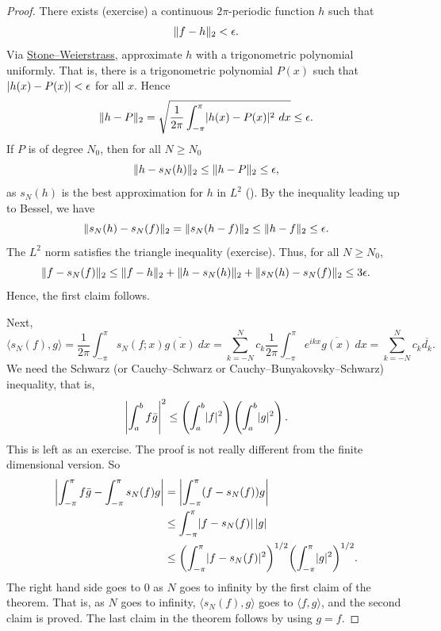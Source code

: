 \begin{proof}
There exists (exercise)
a continuous $2\pi$-periodic function $h$ such that
\begin{equation*}
\lVert {f-h} \rVert_2 < \epsilon .
\end{equation*}
Via \hyperref[thm:SWcomplex]{Stone--Weierstrass},
approximate $h$ with a trigonometric polynomial
uniformly.  That is, there is a trigonometric polynomial $P(x)$
such that
$\lvert {h(x) - P(x)} \rvert < \epsilon$ for all $x$.
Hence
\begin{equation*}
\lVert {h-P} \rVert_2
=
\sqrt{
\frac{1}{2\pi}
\int_{-\pi}^{\pi}
\lvert {h(x)-P(x)} \rvert^2
~
dx
}
\leq \epsilon.
\end{equation*}
If $P$ is of degree $N_0$, then for all $N \geq N_0$
\begin{equation*}
\lVert {h-s_N(h)} \rVert_2 \leq \lVert {h-P} \rVert_2 \leq \epsilon ,
\end{equation*}
as $s_N(h)$ is the best approximation for $h$ in $L^2$ ().
By the inequality leading up to Bessel, we have
\begin{equation*}
\lVert {s_N(h)-s_N(f)} \rVert_2
=
\lVert {s_N(h-f)} \rVert_2
\leq
\lVert {h-f} \rVert_2 \leq \epsilon .
\end{equation*}
The $L^2$ norm satisfies the triangle inequality (exercise).
Thus, for all $N \geq N_0$,
\begin{equation*}
\lVert {f-s_N(f)} \rVert_2
\leq
\lVert {f-h} \rVert_2
+
\lVert {h-s_N(h)} \rVert_2
+
\lVert {s_N(h)-s_N(f)} \rVert_2
\leq 3\epsilon .
\end{equation*}
Hence, the first claim follows.

Next,
\begin{equation*}
\langle s_N(f) , g \rangle
=
\frac{1}{2\pi}
\int_{-\pi}^\pi
s_N(f;x) \overline{g(x)} ~ dx
=
\sum_{k=-N}^N
c_k 
\frac{1}{2\pi}
\int_{-\pi}^\pi
e^{ikx}
\overline{g(x)} ~ dx
=
\sum_{k=-N}^N
c_k 
\overline{d_k} .
\end{equation*}
We need the Schwarz (or Cauchy--Schwarz or Cauchy--Bunyakovsky--Schwarz)
inequality, that is,
\begin{equation*}
{\left\lvert {\int_a^b f\bar{g}} \right\rvert}^2
\leq
\left( \int_a^b \lvert {f} \rvert^2 \right)
\left( \int_a^b \lvert {g} \rvert^2 \right) .
\end{equation*}
This is left as an exercise.  The proof is not really
different from the finite dimensional version.
So
\begin{equation*}
\begin{split}
\left\lvert {\int_{-\pi}^\pi f\bar{g} - \int_{-\pi}^\pi s_N(f)g} \right\rvert
& =
\left\lvert {\int_{-\pi}^\pi (f- s_N(f))g} \right\rvert \\
& \leq
\int_{-\pi}^\pi \lvert {f- s_N(f)} \rvert\, \lvert {g} \rvert \\
& \leq
{\left(\int_{-\pi}^\pi \lvert {f- s_N(f)} \rvert^2 \right)}^{1/2}
{\left( \int_{-\pi}^\pi \lvert {g} \rvert^2 \right)}^{1/2} .
\end{split}
\end{equation*}
The right hand side goes to 0 as $N$ goes to infinity by the first
claim of the theorem.
That is, as $N$ goes to infinity, $\langle s_N(f),g \rangle$
goes to $\langle f,g \rangle$, and
the second claim is proved.  The last claim in the theorem follows by using
$g=f$.
\end{proof}

